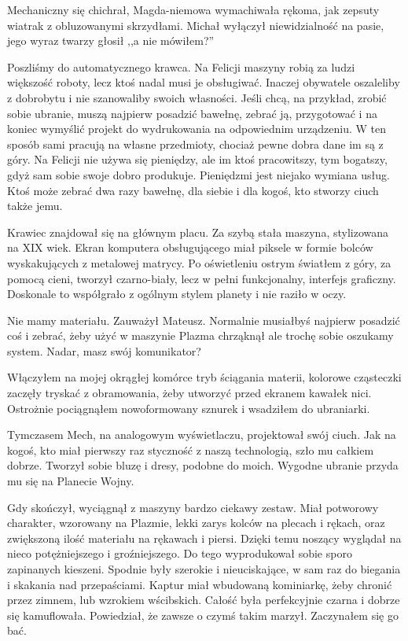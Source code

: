 Mechaniczny się chichrał, Magda-niemowa wymachiwała rękoma, jak zepsuty wiatrak z obluzowanymi skrzydłami. 
Michał wyłączył niewidzialność na pasie, jego wyraz twarzy głosił ,,a nie mówiłem?''

Poszliśmy do automatycznego krawca.
Na Felicji maszyny robią za ludzi większość roboty, lecz ktoś nadal musi je obsługiwać. 
Inaczej obywatele oszaleliby z dobrobytu i nie szanowaliby swoich własności.
Jeśli chcą, na przykład, zrobić sobie ubranie, muszą najpierw posadzić bawełnę, zebrać ją, przygotować i na koniec wymyślić projekt do wydrukowania na odpowiednim urządzeniu.
W ten sposób sami pracują na własne przedmioty, chociaż pewne dobra dane im są z góry.
Na Felicji nie używa się pieniędzy, ale im ktoś pracowitszy, tym bogatszy, gdyż sam sobie swoje dobro produkuje.
Pieniędzmi jest niejako wymiana usług. Ktoś może zebrać dwa razy bawełnę, dla siebie i dla kogoś, kto stworzy ciuch także jemu.

Krawiec znajdował się na głównym placu.
Za szybą stała maszyna, stylizowana na XIX wiek. 
Ekran komputera obsługującego miał piksele w formie bolców wyskakujących z metalowej matrycy. 
Po oświetleniu ostrym światłem z góry, za pomocą cieni, tworzył czarno-biały, lecz w pełni funkcjonalny, interfejs graficzny.
Doskonale to współgrało z ogólnym stylem planety i nie raziło w oczy.

\begin{dialogue}
\ds{} Nie mamy materiału. \dm{} Zauważył Mateusz.
\ds{} Normalnie musiałbyś najpierw posadzić coś i zebrać, żeby użyć w maszynie \dm{} Plazma chrząknął \dm{} ale trochę sobie oszukamy system.
Nadar, masz swój komunikator?
\end{dialogue}

Włączyłem na mojej okrągłej komórce tryb ściągania materii, kolorowe cząsteczki zaczęły tryskać z obramowania, żeby utworzyć przed ekranem kawałek nici.
Ostrożnie pociągnąłem nowoformowany sznurek i wsadziłem do ubraniarki. 

Tymczasem Mech, na analogowym wyświetlaczu, projektował swój ciuch. 
Jak na kogoś, kto miał pierwszy raz styczność z naszą technologią, szło mu całkiem dobrze.
Tworzył sobie bluzę i dresy, podobne do moich. Wygodne ubranie przyda mu się na Planecie Wojny.

Gdy skończył, wyciągnął z maszyny bardzo ciekawy zestaw. Miał potworowy charakter, wzorowany na Plazmie, lekki zarys kolców na plecach i rękach, oraz zwiększoną ilość materiału na rękawach i piersi.
Dzięki temu noszący wyglądał na nieco potężniejszego i groźniejszego.
Do tego wyprodukował sobie sporo zapinanych kieszeni. 
Spodnie były szerokie i nieuciskające, w sam raz do biegania i skakania nad przepaściami.
Kaptur miał wbudowaną kominiarkę, żeby chronić przez zimnem, lub wzrokiem wścibskich.
Całość była perfekcyjnie czarna i dobrze się kamuflowała.
Powiedział, że zawsze o czymś takim marzył.
Zaczynałem się go bać.

